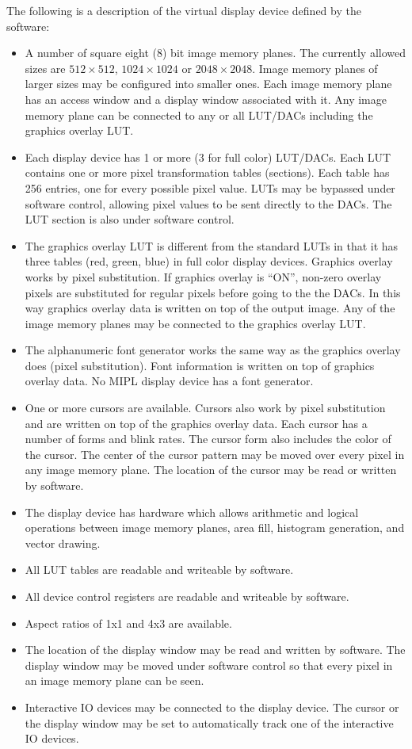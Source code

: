 The following is a description of the virtual display device defined
by the software:
\begin{itemize}
\item A number of square eight (8) bit image memory planes.  The currently
allowed sizes are $512 \times 512$, $1024 \times 1024$ or
$2048 \times 2048$.  Image
memory planes of larger sizes may be configured into smaller ones.
Each image memory plane has an access window and a display window 
associated with it.  Any image memory plane can be connected to any or
all LUT/DACs including the graphics overlay LUT.
\item Each display device has 1 or more (3 for full color) LUT/DACs.  Each
LUT contains one or more pixel transformation tables (sections).
Each table has 256 entries, one for every possible pixel value.  LUTs
may be bypassed under software control, allowing pixel values to be
sent directly to the DACs.  The LUT section is also under software control.
\item The graphics overlay LUT is different from the standard LUTs in that
it has three tables (red, green, blue) in full color display
devices.  Graphics overlay works by pixel substitution.  If graphics
overlay is ``ON'', non-zero overlay pixels are substituted for regular
pixels before going to the the DACs.  In this way graphics overlay data
is written on top of the output image.  Any of the image memory
planes may be connected to the graphics overlay LUT.
\item The alphanumeric font generator works the same way as the graphics
overlay does (pixel substitution).  Font information is written on
top of graphics overlay data.  No MIPL display device has a font generator.
\item One or more cursors are available.  Cursors also work by pixel
substitution and are written on top of the graphics overlay data.
Each cursor has a number of forms and blink rates.  The cursor form
also includes the color of the cursor.  The center of the cursor
pattern may be moved over every pixel in any image memory plane.  The
location of the cursor may be read or written by software.
\item The display device has hardware which allows arithmetic and logical
operations between image memory planes, area fill, histogram
generation, and vector drawing.
\item All LUT tables are readable and writeable by software.
\item All device control registers are  readable  and  writeable  by
software. 
\item Aspect ratios of 1x1 and 4x3 are available.
\item The location of the display window may be read and written by
software.  The display window may be moved under software control so
that every pixel in an image memory plane can be seen.
\item Interactive IO devices may be connected to the display device.  The
cursor or the display window may be set to automatically track one of
the interactive IO devices.
\end{itemize}
\cleardoublepage
